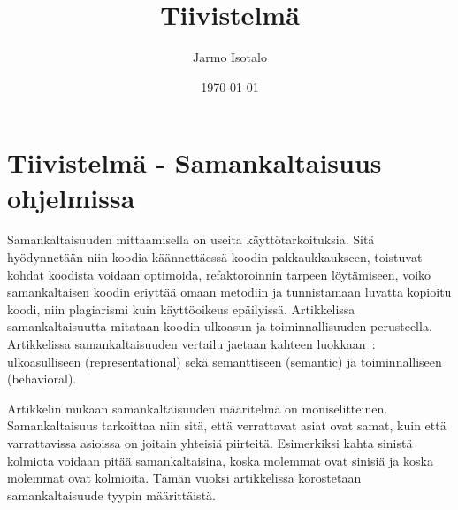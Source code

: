 \documentclass[finnish]{../tktltiki2}
\title{Tiivistelmä}
\author{Jarmo Isotalo}
\date{\today}
\theoremstyle{definition}
\theoremstyle{remark}
\begin{document}

\frontmatter      %

\maketitle        %


\mainmatter
\section{Tiivistelmä - Samankaltaisuus ohjelmissa}

Samankaltaisuuden mittaamisella on useita käyttötarkoituksia. Sitä hyödynnetään niin koodia käännettäessä koodin pakkaukkaukseen, toistuvat kohdat koodista voidaan optimoida, refaktoroinnin tarpeen löytämiseen, voiko samankaltaisen koodin eriyttää omaan metodiin ja tunnistamaan luvatta kopioitu koodi, niin plagiarismi kuin käyttöoikeus epäilyissä.
Artikkelissa samankaltaisuutta mitataan koodin ulkoasun ja toiminnallisuuden perusteella. Artikkelissa samankaltaisuuden vertailu jaetaan kahteen luokkaan~\cite{Walenstein_similarityin}: ulkoasulliseen (representational) sekä semanttiseen (semantic) ja toiminnalliseen (behavioral). 

Artikkelin mukaan samankaltaisuuden määritelmä on moniselitteinen. Samankaltaisuus tarkoittaa niin sitä, että verrattavat asiat ovat samat, kuin että varrattavissa asioissa on joitain yhteisiä piirteitä. Esimerkiksi kahta sinistä kolmiota voidaan pitää samankaltaisina, koska molemmat ovat sinisiä ja koska molemmat ovat kolmioita. Tämän vuoksi artikkelissa korostetaan samankaltaisuude tyypin määrittäistä.
\end{document}
